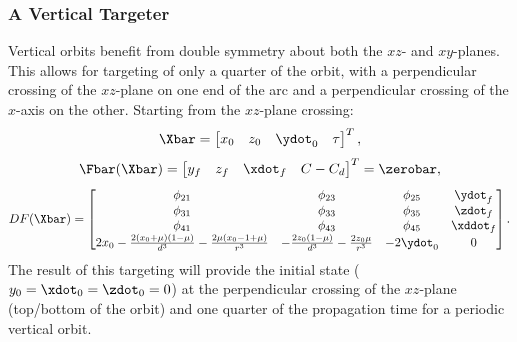 \subsubsection{A Vertical Targeter}
Vertical orbits benefit from double symmetry about both the $xz$- and $xy$-planes. This allows for
targeting of only a quarter of the orbit, with a perpendicular crossing of the $xz$-plane on one
end of the arc and a perpendicular crossing of the $x$-axis on the other. Starting from the
$xz$-plane crossing:
\begin{equation}
    \Xbar=\begin{bmatrix}   x_{0}   &   z_{0}   &   \ydot_{0}   &   \tau    \end{bmatrix}^{T},
    \label{eq:verticalfreevar}
\end{equation}
\begin{equation}
    \Fbar(\Xbar)=\begin{bmatrix}    y_{f}   &   z_{f}   &   \xdot_{f}   &   C-C_{d} \end{bmatrix}^{T}=\zerobar,
    \label{eq:verticalconst}
\end{equation}
\begin{equation}
    DF(\Xbar)=\begin{bmatrix}   \phi_{21}                                                                   &   \phi_{23}                                               &   \phi_{25}   &   \ydot_{f}   \\
                                \phi_{31}                                                                   &   \phi_{33}                                               &   \phi_{35}   &   \zdot_{f}   \\
                                \phi_{41}                                                                   &   \phi_{43}                                               &   \phi_{45}   &   \xddot_{f}  \\
                                2x_{0}-\frac{2(x_{0}+\mu)(1-\mu)}{d^{3}}-\frac{2\mu(x_{0}-1+\mu)}{r^{3}}    &   -\frac{2z_{0}(1-\mu)}{d^{3}}-\frac{2z_{0}\mu}{r^{3}}    &   -2\ydot_{0} &   0           \end{bmatrix}.
    \label{eq:verticaljacobian}
\end{equation}
The result of this targeting will provide the initial state ($y_{0}=\xdot_{0}=\zdot_{0}=0$) at the
perpendicular crossing of the $xz$-plane (top/bottom of the orbit) and one quarter of the
propagation time for a periodic vertical orbit.

